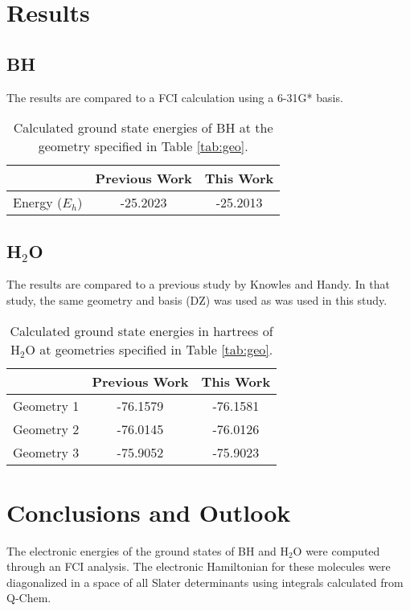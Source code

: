 \documentclass[final,3p,times,twocolumn]{elsarticle}
\begin{document}
\section{Results}
\subsection{BH} \label{sec:bhresults}
The results are compared to a FCI calculation using a 6-31G* basis.\cite{cccbdb}
\begin{table}
\begin{tabular}{l|cc} \hline\hline
& Previous Work\cite{cccbdb} & This Work \\ \hline
Energy ($E_h$) & -25.2023 & -25.2013 \\ \hline\hline
\end{tabular}
\caption{Calculated ground state energies of BH at the geometry specified in Table \ref{tab:geo}.}
\label{tab:bhresults}
\end{table}

\subsection{H$_2$O} \label{sec:h2oresults}
The results are compared to a previous study by Knowles and Handy.\cite{handy-1983} In that study, the same geometry and basis (DZ) was used as was used in this study.

\begin{table}
\begin{tabular}{l|cc} \hline\hline
& Previous Work\cite{handy-1983} & This Work \\ \hline
Geometry 1 & -76.1579 & -76.1581 \\ 
Geometry 2 & -76.0145 & -76.0126 \\
Geometry 3 & -75.9052 & -75.9023 \\\hline\hline
\end{tabular}
\caption{Calculated ground state energies in hartrees of H$_2$O at geometries specified in Table \ref{tab:geo}.}
\end{table}


\section{Conclusions and Outlook}
\label{sect:Concl}
The electronic energies of the ground states of BH and H$_2$O were computed through an FCI analysis. The electronic Hamiltonian for these molecules were diagonalized in a space of all Slater determinants using integrals calculated from Q-Chem.
\end{document}
